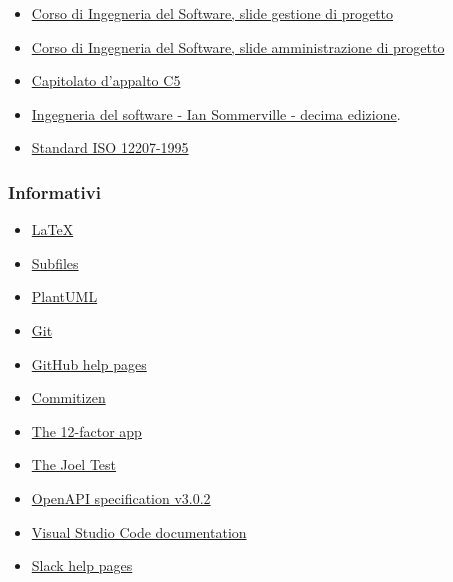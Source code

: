 \documentclass[../norme-di-progetto.tex]{subfiles}
\begin{document}
\begin{itemize}
  \item \href{https://www.math.unipd.it/~tullio/IS-1/2019/Dispense/L06.pdf}{Corso di Ingegneria del Software, slide gestione di progetto}
  \item \href{https://www.math.unipd.it/~tullio/IS-1/2019/Dispense/FC01.pdf}{Corso di Ingegneria del Software, slide amministrazione di progetto}
  \item \href{https://www.math.unipd.it/~tullio/IS-1/2019/Progetto/C5.pdf}{Capitolato d'appalto C5}
  \item \href{https://www.pearson.it/opera/pearson/0-6424-ingegneria_del_software}{Ingegneria del software - Ian Sommerville - decima edizione}.
  \item \href{https://www.math.unipd.it/~tullio/IS-1/2009/Approfondimenti/ISO_12207-1995.pdf}{Standard ISO 12207-1995}
\end{itemize}

\subsubsection{Informativi}%
\label{subs:riferimenti/informativi}

\begin{itemize}
  \item \href{https://www.latex-project.org/help/documentation/}{\LaTeX}
  \item \href{https://www.overleaf.com/learn/latex/Multi-file_LaTeX_projects#The_subfiles_package}{Subfiles}
  \item \href{https://plantuml.com/}{PlantUML}
  \item \href{https://git-scm.com/}{Git}
  \item \href{https://help.github.com/en}{GitHub help pages}
  \item \href{https://commitizen.github.io/cz-cli/}{Commitizen}
  \item \href{https://12factor.net/}{The 12-factor app}
  \item \href{https://www.joelonsoftware.com/2000/08/09/the-joel-test-12-steps-to-better-code/}{The Joel Test}
  \item \href{https://spec.openapis.org/oas/v3.0.2}{OpenAPI specification v3.0.2}
  \item \href{https://code.visualstudio.com/docs}{Visual Studio Code documentation}
  \item \href{https://slack.com/intl/en-it/help}{Slack help pages}
\end{itemize}
\end{document}

